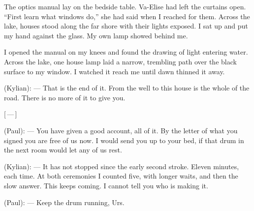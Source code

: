 The optics manual lay on the bedside table. Va-Elise had left the curtains open. ``First learn what windows do,'' she had said when I reached for them. Across the lake, houses stood along the far shore with their lights exposed. I sat up and put my hand against the glass. My own lamp showed behind me.\par

I opened the manual on my knees and found the drawing of light entering water. Across the lake, one house lamp laid a narrow, trembling path over the black surface to my window. I watched it reach me until dawn thinned it away.\par

\ornament

\begin{room}

(Kylian): --- That is the end of it. From the well to this house is the whole of the road. There is no more of it to give you.

\centerline{[\,---\,]}

(Paul): --- You have given a good account, all of it. By the letter of what you signed you are free of us now. I would send you up to your bed, if that drum in the next room would let any of us rest.

(Kylian): --- It has not stopped since the early second stroke. Eleven minutes, each time. At both ceremonies I counted five, with longer waits, and then the slow answer. This keeps coming. I cannot tell you who is making it.

(Paul): --- Keep the drum running, Urs.

\end{room}

\ornament
